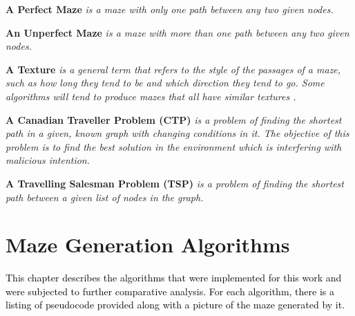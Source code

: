 \begin{definition}\textbf{A Perfect Maze} \emph{is a maze with only one path between any two given nodes.}\end{definition}
\begin{definition}\textbf{An Unperfect Maze} \emph{is a maze with more than one path between any two given nodes.}\end{definition}
 \begin{definition}\textbf{A Texture} \emph{is a general term that refers to the style of the passages of a maze, such as how long they tend to be and which direction they tend to go. Some algorithms will tend to produce mazes that all have similar textures \cite{15}.}\end{definition}
\begin{definition}\textbf{A Canadian Traveller Problem (CTP)} \emph{is a problem of finding the shortest path in a given, known graph with changing conditions in it. The objective of this problem is to find the best solution in the environment which is interfering with malicious intention.}\end{definition}
\begin{definition}\textbf{A Travelling Salesman Problem (TSP)} \emph{is a problem of finding the shortest path between a given list of nodes in the graph.} \end{definition}
\section{Maze Generation Algorithms}
\textcolor{black}{This chapter describes the algorithms that were implemented for this work and were subjected to further comparative analysis. For each algorithm, there is a listing of pseudocode provided along with a picture of the maze generated by it.}

